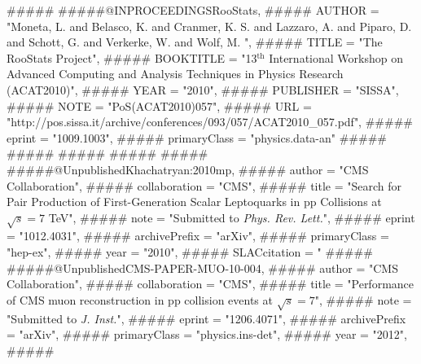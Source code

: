 ##### %
#####@INPROCEEDINGS{RooStats,
#####  AUTHOR       = "Moneta, L. and Belasco, K. and  Cranmer, K. S. and Lazzaro, A. and Piparo, D. and Schott, G. and Verkerke, W. and Wolf, M. ",
#####  TITLE        = "The {R}oo{S}tats {P}roject",
#####  BOOKTITLE = "13$^\text{th}$ International Workshop on Advanced Computing and Analysis Techniques in Physics Research (ACAT2010)",
#####  YEAR         = "2010",
#####  PUBLISHER = "SISSA",
#####  NOTE = "{PoS(ACAT2010)057}",
#####  URL          = "http://pos.sissa.it/archive/conferences/093/057/ACAT2010_057.pdf",
#####  eprint = "1009.1003",
#####  primaryClass = "physics.data-an"
#####}
#####%
#####%
#####%
#####%
#####@Unpublished{Khachatryan:2010mp,
#####     author    = "{CMS Collaboration}",
#####     collaboration = "CMS",
#####     title     = "Search for Pair Production of First-Generation Scalar Leptoquarks in pp Collisions at $\sqrt{s} = 7$ {TeV}",
#####     note  = "Submitted to \textit{Phys. Rev. Lett.}",
#####     eprint    = "1012.4031",
#####     archivePrefix = "arXiv",
#####     primaryClass  =  "hep-ex",
#####     year = "2010",
#####     SLACcitation  = "%
#####}
#####@Unpublished{CMS-PAPER-MUO-10-004,
#####     author    = "{CMS Collaboration}",
#####     collaboration = "CMS",
#####     title     = "Performance of CMS muon reconstruction in pp collision events at {$\sqrt{s} = 7$\TeV}",
#####     note  = "Submitted to \textit{J. Inst.}",
#####     eprint    = "1206.4071",
#####     archivePrefix = "arXiv",
#####     primaryClass  =  "physics.ins-det",
#####     year = "2012",
#####}
